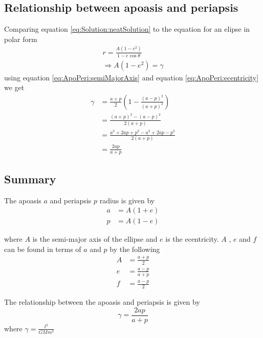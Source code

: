 \subsection{Relationship between apoasis and periapsis}
Comparing equation \ref{eq:Solution:neatSolution} to the equation for an elipse in polar form
\begin{align}
r=\frac{A(1-e^2)}{1-e\cos\theta} \label{eq:Solution:ellipse}\\
\Rightarrow A(1-e^2)=\gamma
\end{align}
using equation \ref{eq:ApoPeri:semiMajorAxis} and equation \ref{eq:ApoPeri:ecentricity} we get
\begin{align}
\gamma&=\frac{a+p}{2}\left(1-\frac{(a-p)^2}{(a+p)^2}\right) \nonumber \\
&=\frac{(a+p)^2-(a-p)^2}{2(a+p)} \nonumber \\
&=\frac{a^2+2ap+p^2-a^2+2ap-p^2}{2(a+p)} \nonumber \\
&=\frac{2ap}{a+p} \label{eq:ApoPeri:gamma}
\end{align}

\begin{framed}
\subsection{Summary}
The apoasis $a$ and periapsis $p$ radius is given by
\begin{align*}
a&=A(1+e) \\
p&=A(1-e)
\end{align*}

where $A$ is the semi-major axis of the ellipse and $e$ is the ecentricity. $A$ , $e$ and $f$ can be found in terms of $a$ and $p$ by the following
\begin{align*}
A&=\frac{a+p}{2} \\
e&=\frac{a-p}{a+p} \\
f&=\frac{a-p}{2}
\end{align*}

The relationship between the apoasis and periapsis is given by
\begin{equation*}
\gamma=\frac{2ap}{a+p}
\end{equation*}
where $\gamma=\frac{l^2}{GMm^2}$
\end{framed}